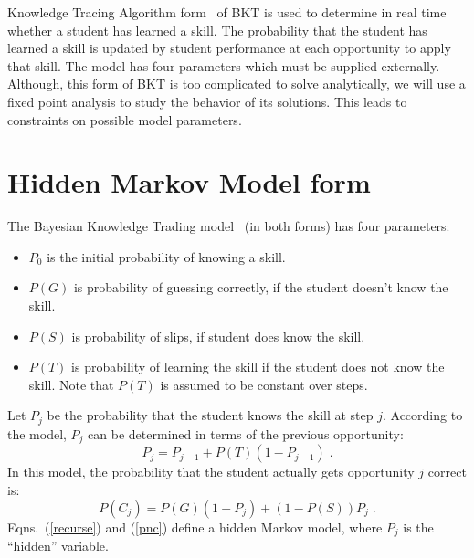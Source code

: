 \documentclass{acmlarge-edm}
\begin{document}

Knowledge Tracing Algorithm form~\cite{corbett_knowledge_1994} 
of BKT is used to 
determine in real time whether a student has learned a skill.
The probability that the student has learned a skill is 
updated by student performance at each opportunity to apply
that skill.  The model has four parameters which must be 
supplied externally.  Although, this form of BKT is too complicated
to solve analytically, we will use a fixed point analysis to
study the behavior of its solutions.  This leads to constraints on possible model parameters.

\section{Hidden Markov Model form}

The Bayesian Knowledge Trading model~\cite{corbett_knowledge_1994}
(in both forms) has four parameters:
%
\begin{itemize}
   \item $P_0$ is the initial probability of knowing a skill.
   \item $P(G)$ is probability of guessing correctly, if the student        
         doesn't know the skill.
   \item $P(S)$ is probability of slips, if student does know the skill.
   \item $P(T)$ is probability of learning the skill if the student 
         does not know the skill.  Note that $P(T)$ is assumed to 
         be constant over steps.
\end{itemize}
%
Let $P_j$ be the probability that the student knows the skill at 
step $j$. According to the model,  $P_j$ can
be determined in terms of the previous opportunity:
%
\begin{equation}
          P_j = P_{j-1} + P(T)\left(1-P_{j-1}\right)  \; . \label{recurse}
\end{equation}
%
In this model, the probability that the student actually gets
opportunity $j$ correct is:
%
\begin{equation}
        P(C_j) = P(G)\left(1-P_j\right) + \left(1-P(S)\right) P_j \; . 
         \label{pnc}
\end{equation}
%
Eqns.~(\ref{recurse}) and
(\ref{pnc}) define a hidden Markov model, where $P_j$ is the 
``hidden'' variable.
\end{document}
